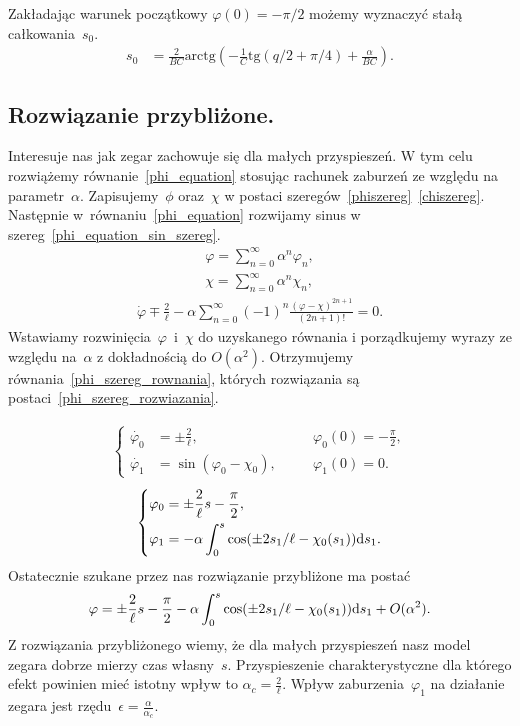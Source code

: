 Zakładając warunek początkowy $\varphi(0) = -\pi/2$
 możemy wyznaczyć stałą całkowania~$s_0$.
\begin{align*}
s_0 & = \frac{2}{BC} \text{arctg}  
\left( - \frac{1}{C}\text{tg} (q/2 + \pi/4) +\frac{\alpha}{BC} \right).
\end{align*}

\newpage
\subsection{Rozwiązanie przybliżone.}
Interesuje nas jak zegar zachowuje się dla małych przyspieszeń. 
W tym celu rozwiążemy równanie~\eqref{phi_equation} stosując 
rachunek zaburzeń ze względu na 
parametr~$\alpha$. Zapisujemy~$\phi$ oraz~$\chi$ w postaci
szeregów~\eqref{phiszereg}~\eqref{chiszereg}. 
Następnie w~równaniu~\eqref{phi_equation} rozwijamy sinus 
w szereg~\eqref{phi_equation_sin_szereg}. 
\begin{align}\label{phiszereg}
\varphi = \sum_{n=0}^{\infty} \alpha^n \varphi_n, \\
\chi = \sum_{n=0}^{\infty} \alpha^n \chi_n , \label{chiszereg}
\end{align}
\begin{align}\label{phi_equation_sin_szereg}
\dot{\varphi} \mp \frac{2}{\ell} - \alpha
\sum_{n=0}^{\infty} (-1)^n 
\frac{(\varphi-\chi)^{2n+1}}{(2n+1)!} =0.
\end{align}
Wstawiamy 
rozwinięcia~$\varphi$~i~$\chi$ do uzyskanego równania i porządkujemy wyrazy
ze względu na~$\alpha$ z dokładnością do $O(\alpha^2)$.
 Otrzymujemy równania~\eqref{phi_szereg_rownania}, których 
rozwiązania są postaci~\eqref{phi_szereg_rozwiazania}.

\begin{align}\label{phi_szereg_rownania}
\left\{ 
\begin{aligned}
\dot{\varphi_0} & = \pm \frac{2}{\ell} , &\quad & 
\varphi_0(0)=-\frac{\pi}{2},\\
\dot{\varphi_1} & = \sin (\varphi_0 - \chi_0  ), &\quad & 
\varphi_1(0) = 0 .
\end{aligned}
\right.
\end{align}
\begin{align}\label{phi_szereg_rozwiazania}
\left\{ 
\begin{aligned}
\varphi_0 & =  \pm \frac{2}{\ell}s - \frac{\pi}{2},\\
\varphi_1 & =  -\alpha \int_0^s \cos 
(\pm 2 s_1 / \ell  - \chi_0(s_1)  ) \text{d} s_1 .
\end{aligned}
\right.
\end{align}
Ostatecznie szukane przez nas rozwiązanie przybliżone ma 
postać
\begin{align}\label{phi_szereg_rozwiazanie}
\varphi =  \pm \frac{2}{\ell}s - \frac{\pi}{2} 
-\alpha  \int_0^s \cos (\pm 2 s_1 / \ell  - \chi_0(s_1)  ) \text{d} s_1 
+O(\alpha^2).
\end{align}
Z rozwiązania przybliżonego wiemy, 
że dla małych przyspieszeń nasz model zegara dobrze 
mierzy czas własny~$s$. Przyspieszenie charakterystyczne dla 
którego efekt powinien mieć istotny wpływ to
$\alpha_c = \frac{2}{\ell}$.
Wpływ zaburzenia~$\varphi_1$ na działanie zegara jest 
rzędu~$\epsilon = \frac{\alpha}{\alpha_c}.$

